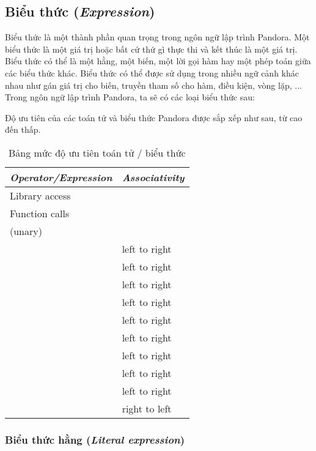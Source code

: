 \subsection{Biểu thức (\textit{Expression})}
\label{ch2:expr}

Biểu thức là một thành phần quan trọng trong ngôn ngữ lập trình Pandora. Một biểu thức là một giá trị hoặc bất cứ thứ gì thực thi và kết thúc là một giá trị. Biểu thức có thể là một hằng, một biến, một lời gọi hàm hay một phép toán giữa các biểu thức khác. Biểu thức có thể được sử dụng trong nhiều ngữ cảnh khác nhau như gán giá trị cho biến, truyền tham số cho hàm, điều kiện, vòng lặp, ... Trong ngôn ngữ lập trình Pandora, ta sẽ có các loại biểu thức sau:

\regexexpr

Độ ưu tiên của các toán tử và biểu thức Pandora được sắp xếp như sau, từ cao đến thấp. 

\begin{longtable}{| l | l |}
    \caption{Bảng mức độ ưu tiên toán tử / biểu thức}
    \label{table2:precedence}\\
\hline
\textbf{\textit{Operator/Expression}} & \textbf{\textit{Associativity}} \\
\hline
Library access & \\
\hline
Function calls & \\
\hline
\w{$!$} \w{$-$} (unary) & \\
\hline
\w{$*$} \w{$/$} \w{$\%$} & left to right \\
\hline
\w{$+$} \w{$-$} & left to right \\
\hline
\w{$<<$} \w{$>>$} & left to right \\
\hline
\w{$\&$} & left to right \\
\hline
\w{$\wedge$} & left to right \\
\hline
\w{$|$} & left to right \\
\hline
\w{$==$} \w{$!=$} \w{$<$} \w{$>$} \w{$<=$} \w{$>=$} & left to right \\
\hline
\w{$\&\&$} & left to right \\
\hline
\w{$|\,|$} & left to right \\
\hline
\w{$=$} \w{$+=$} \w{$-=$} \w{$*=$} \w{$/=$} \w{$\%=$} \w{$<<=$} \w{$>>=$} \w{$\&=$} \w{$\wedge=$} \w{$|=$} & right to left \\
\hline
\end{longtable}

\subsubsection{Biểu thức hằng (\textit{Literal expression})}

